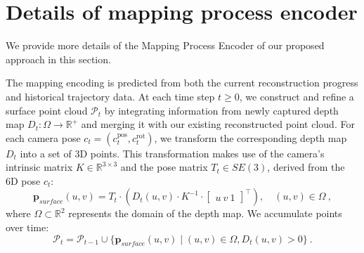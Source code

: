 \section{Details of mapping process encoder}

We provide more details of the Mapping Process Encoder of our proposed approach in this section.

The mapping encoding is predicted from both the current reconstruction progress and historical trajectory data. At each time step $t \geq 0$, we construct and refine a surface point cloud $\mathcal{P}_t$ by integrating information from newly captured depth map $D_t: \Omega \to \mathbb{R}^+$ and merging it with our existing reconstructed point cloud. For each camera pose $c_t = (c^\text{pos}_t, c^\text{rot}_t)$, we transform the corresponding depth map $D_t$ into a set of 3D points. This transformation makes use of the camera's intrinsic matrix $K \in \mathbb{R}^{3\times3}$ and the pose matrix $T_t \in SE(3)$, derived from the 6D pose $c_t$:
%
\begin{equation}
\mathbf{p}_{surface}(u, v) = T_t \cdot \left( D_t(u, v) \cdot K^{-1} \cdot \begin{bmatrix} u \ v \ 1 \end{bmatrix}^\top \right), \quad (u, v) \in \Omega \> ,
\end{equation}
%
where $\Omega \subset \mathbb{R}^2$ represents the domain of the depth map. We accumulate points over time:
%
\begin{equation}
\mathcal{P}_t = \mathcal{P}_{t-1} \cup \{\mathbf{p}_{surface}(u, v) \mid (u, v) \in \Omega, D_t(u, v) > 0\} \> .
\end{equation}

